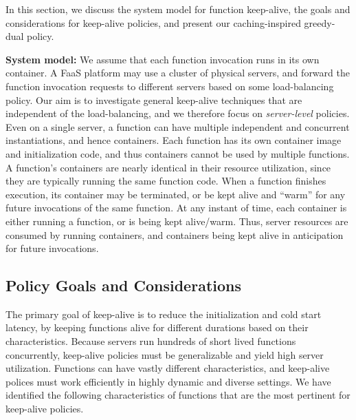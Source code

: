 
In this section, we discuss the system model for function keep-alive, the goals and considerations for keep-alive policies, and present our caching-inspired greedy-dual policy. 

\noindent \textbf{System model:} 
We assume that each function invocation runs in its own container. 
%
A FaaS platform may use a cluster of physical servers, and forward the function invocation requests to different servers based on some load-balancing policy. 
Our aim is to investigate general keep-alive techniques that are independent of the load-balancing, and we therefore focus on \emph{server-level} policies. 
Even on a single server, a function can have multiple independent and concurrent instantiations, and hence containers.
Each function has its own container image and initialization code, and thus containers cannot be used by multiple functions. 
A function's containers are nearly identical in their resource utilization, since they are typically running the same function code.
When a function finishes execution, its container may be terminated, or be kept alive and ``warm'' for any future invocations of the same function. 
%
At any instant of time, each container is either running a function, or is being kept alive/warm. %
%
Thus, server resources are consumed by running containers, and containers being kept alive in anticipation for future invocations. 




\vspace*{\subsecspace}
\subsection{Policy Goals and Considerations}
\vspace*{\subsecspace}

The primary goal of keep-alive is to reduce the initialization and cold start latency, by keeping functions alive for different durations based on their characteristics. 
Because servers run hundreds of short lived functions concurrently, keep-alive policies must be generalizable and yield high server utilization. 
%
Functions can have vastly different characteristics, and keep-alive polices must work efficiently in highly dynamic and diverse settings. %
We have identified the following characteristics of functions that are the most pertinent for keep-alive policies.


